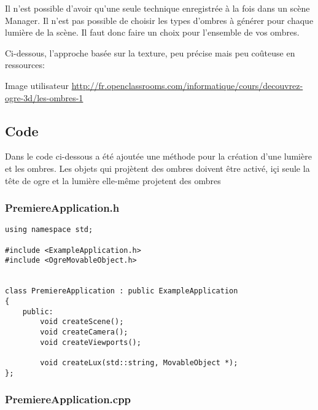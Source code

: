 Il n'est possible d'avoir qu'une seule technique enregistr\'ee \`{a} la fois dans un sc\`ene Manager. Il n'est pas possible de choisir les types d'ombres \`{a} g\'en\'erer pour chaque lumi\`ere de la sc\`ene. Il faut donc faire un choix pour l'ensemble de vos ombres.

Ci-dessous, l'approche bas\'ee sur la texture, peu pr\'ecise mais peu co\^uteuse en ressources:

Image utilisateur \url{http://fr.openclassrooms.com/informatique/cours/decouvrez-ogre-3d/les-ombres-1}



\subsection{Code}
Dans le code ci-dessous a \'et\'e ajout\'ee une m\'ethode pour la cr\'eation d'une lumi\`ere et les ombres. Les objets qui proj\`etent des ombres doivent \^etre activ\'e, i\c{c}i seule la t\^ete de ogre et la lumi\`ere elle-m\^eme projetent des ombres

\subsubsection{PremiereApplication.h}



\begin{lstlisting}[caption={PremiereApplication.h: ajout d'une m\'ethode pour la gestion de lumi\`ere et des ombres}]
using namespace std;

#include <ExampleApplication.h>
#include <OgreMovableObject.h>


class PremiereApplication : public ExampleApplication
{
    public:
        void createScene();
        void createCamera();
        void createViewports();

        void createLux(std::string, MovableObject *);
};

\end{lstlisting}







\subsubsection{PremiereApplication.cpp}



